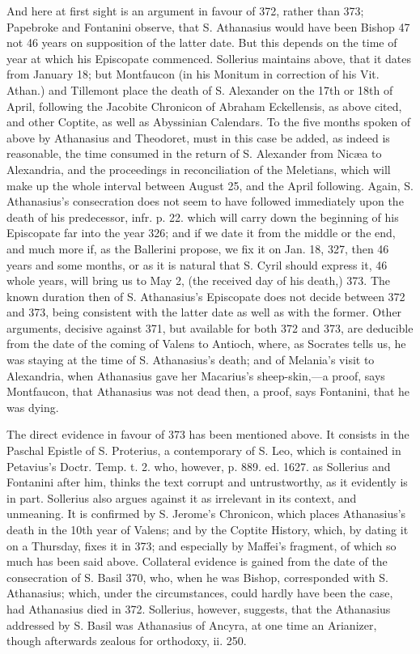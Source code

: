 And here at first sight is an
argument in favour of 372, rather than 373; Papebroke and Fontanini
observe, that S. Athanasius would have been Bishop 47 not 46 years on
supposition of the latter date. But this depends on the time of year
at which his Episcopate commenced. Sollerius maintains above, that it
dates from January 18; but Montfaucon (in his Monitum in correction of
his Vit. Athan.) and Tillemont place the death of S. Alexander on the
17th or 18th of April, following the Jacobite Chronicon of Abraham
Eckellensis, as above cited, and other Coptite, as well as Abyssinian
Calendars. To the five months spoken of above by Athanasius and
Theodoret, must in this case be added, as indeed is reasonable, the
time consumed in the return of S. Alexander from Nicæa to Alexandria,
and the proceedings in reconciliation of the Meletians, which will
make up the whole interval between August 25, and the April following.
Again, S. Athanasius's consecration does not seem to have followed
immediately upon the death of his predecessor, infr. p. 22.
which will carry down the beginning of his Episcopate far into the
year 326; and if we date it from the middle or the end, and much more
if, as the Ballerini propose, we fix it on Jan. 18, 327, then 46 years
and some months, or as it is natural that S. Cyril should express it,
46 whole years, will bring us to May 2, (the received day of his
death,) 373. The known duration then of S. Athanasius's Episcopate
does not decide between 372 and 373, being consistent with the latter
date as well as with the former. Other arguments, decisive against
371, but available for both 372 and 373, are deducible from the date
of the coming of Valens to Antioch, where, as Socrates tells us, he
was staying at the time of S. Athanasius's death; and of Melania's
visit to Alexandria, when Athanasius gave her Macarius's
sheep-skin,—a proof, says Montfaucon, that Athanasius was not dead
then, a proof, says Fontanini, that he was dying.

The direct evidence in favour
of 373 has been mentioned above. It consists in the Paschal Epistle of
S. Proterius, a contemporary of S. Leo, which is contained in Petavius's
Doctr. Temp. t. 2. who, however, p. 889. ed. 1627. as Sollerius and
Fontanini after him, thinks the text corrupt and untrustworthy, as it
evidently is in part. Sollerius also argues against it as irrelevant
in its context, and unmeaning. It is confirmed by S. Jerome's
Chronicon, which places Athanasius's death in the 10th year of Valens;
and by the Coptite History, which, by dating it on a Thursday, fixes
it in 373; and especially by Maffei's fragment, of which so much has
been said above. Collateral evidence is gained from the date of the
consecration of S. Basil 370, who, when he was Bishop, corresponded
with S. Athanasius; which, under the circumstances, could hardly have
been the case, had Athanasius died in 372. Sollerius, however,
suggests, that the Athanasius addressed by S. Basil was Athanasius of
Ancyra, at one time an Arianizer, though afterwards zealous for
orthodoxy, ii. 250.

